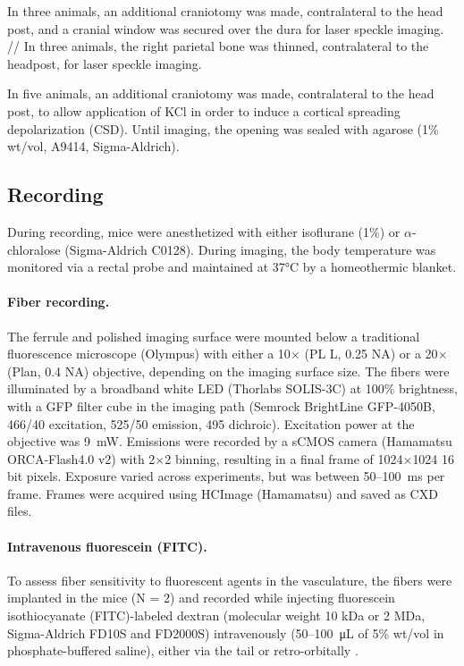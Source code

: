 In three animals, an additional craniotomy was made, contralateral to 
the head post, and a cranial window was secured over the dura for 
laser speckle imaging. // In three animals, the right parietal bone 
was thinned, contralateral to the headpost, for laser speckle imaging.

In five animals, an additional craniotomy was made, contralateral to 
the head post, to allow application of KCl in order to induce a 
cortical spreading depolarization (CSD). Until imaging, the opening 
was sealed with agarose (1\% wt/vol, A9414, Sigma-Aldrich).

\subsection{Recording}

During recording, mice were anesthetized with either isoflurane (1\%) 
or $\alpha$-chloralose (Sigma-Aldrich C0128). During imaging, the body 
temperature was monitored via a rectal probe and maintained at 
37\si{\celsius} by a homeothermic blanket.


\paragraph{Fiber recording.} The ferrule and polished imaging surface were mounted
 below a traditional fluorescence microscope (Olympus) with either a 
10$\times$ (PL L, 0.25 NA) or a 20$\times$ (Plan, 0.4 NA) objective, 
depending on the imaging surface size. The fibers were illuminated by 
a broadband white LED (Thorlabs SOLIS-3C) at 100\% brightness, with a 
GFP filter cube in the imaging path (Semrock BrightLine GFP-4050B, 
466/40 excitation, 525/50 emission, 495 dichroic). Excitation power at
 the objective was 9~\si{\milli\watt}. Emissions were recorded by a 
sCMOS camera (Hamamatsu ORCA-Flash4.0 v2) with 2$\times$2 binning, 
resulting in a final frame of 1024$\times$1024 16 bit pixels. Exposure
 varied across experiments, but was between 50--100~ms per frame. 
Frames were acquired using HCImage (Hamamatsu) and saved as CXD files.



\paragraph{Intravenous fluorescein (FITC).} To assess fiber sensitivity to 
fluorescent agents in the vasculature, the fibers were implanted in 
the mice (N = 2) and recorded while injecting fluorescein 
isothiocyanate (FITC)-labeled dextran (molecular weight 10 kDa or 2 
MDa, Sigma-Aldrich FD10S and FD2000S) intravenously 
(50--100~\si{\micro\liter} of 5\% wt/vol in phosphate-buffered 
saline), either via the tail or retro-orbitally \cite{Yardeni:2011fs}.




